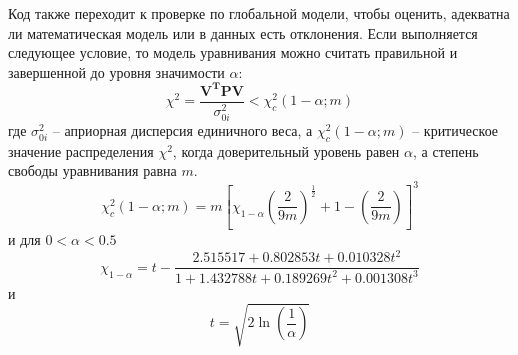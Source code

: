 Код также переходит к проверке по глобальной модели, чтобы оценить, адекватна
ли математическая модель или в данных есть отклонения. Если выполняется
следующее условие, то модель уравнивания можно считать правильной и
завершенной до уровня значимости $\alpha$:
\begin{equation}
    \chi^2=\frac{\mathbf{V}^{\mathbf{T}}\mathbf{P}\mathbf{V}}{\sigma^2_{0i}}<\chi^2_c\left(1-\alpha;m\right)
\end{equation}
где $\sigma^2_{0i}$ -- априорная дисперсия единичного веса, а
$\chi^2_c\left(1-\alpha;m\right)$ -- критическое значение распределения
$\chi^2$, когда доверительный уровень равен $\alpha$, а степень свободы уравнивания 
равна $m$.
\begin{equation}
    \chi^2_c\left(1-\alpha;m\right)=m\left[\chi_{1-\alpha}\left(\frac{2}{9m}\right)^{\frac{1}{2}}+1-\left(\frac{2}{9m}\right)\right]^3
\end{equation}
и для $0<\alpha<0.5$
\begin{equation}
    \chi_{1-\alpha} = t - \frac{2.515517 + 0.802853t + 0.010328t^2}{1 + 1.432788t + 0.189269t^2 + 0.001308t^3}
\end{equation}
и
\begin{equation}
    t = \sqrt{2\ln \left(\frac{1}{\alpha}\right)}
\end{equation}
